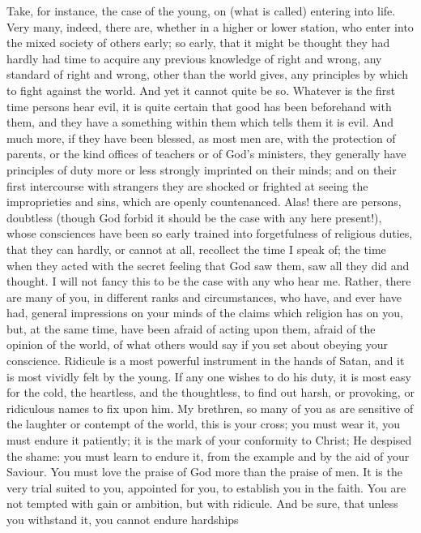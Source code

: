 Take, for instance, the case of the young, on (what is called)
entering into life. Very many, indeed, there are, whether in a higher
or lower station, who enter into the mixed society of others early; so
early, that it might be thought they had hardly had time to acquire
any previous knowledge of right and wrong, any standard of right and
wrong, other than the world gives, any principles by which to fight
against the world. And yet it cannot quite be so. Whatever is the
first time persons hear evil, it is quite certain that good has been
beforehand with them, and they have a something within them which
tells them it is evil. And much more, if they have been blessed, as
most men are, with the protection of parents, or the kind offices of
teachers or of God's ministers, they generally have principles of duty
more or less strongly imprinted on their minds; and on their first
intercourse with strangers they are shocked or frighted at seeing the
improprieties and sins, which are openly countenanced. Alas! there are
persons, doubtless (though God forbid it should be the case with any
here present!), whose consciences have been so early trained into
forgetfulness of religious duties, that they can hardly, or cannot at
all, recollect the time I speak of; the time when they acted with the
secret feeling that God saw them, saw all they did and thought. I will
not fancy this to be the case with any who hear me. Rather, there are
many of you, in different ranks and circumstances, who have, and ever
have had, general impressions on your minds of the claims which
religion has on you, but, at the same time, have been afraid of acting
upon them, afraid of the opinion of the world, of what others would
say if you set about obeying your conscience. Ridicule is a most
powerful instrument in the hands of Satan, and it is most vividly felt
by the young. If any one wishes to do his duty, it is most easy for
the cold, the heartless, and the thoughtless, to find out harsh, or
provoking, or ridiculous names to fix upon him. My brethren, so many
of you as are sensitive of the laughter or contempt of the world, this
is your cross; you must wear it, you must endure it patiently; it is
the mark of your conformity to Christ; He despised the shame: you must
learn to endure it, from the example and by the aid of your Saviour.
You must love the praise of God more than the praise of men. It is the
very trial suited to you, appointed for you, to establish you in the
faith. You are not tempted with gain or ambition, but with ridicule.
And be sure, that unless you withstand it, you cannot endure hardships
